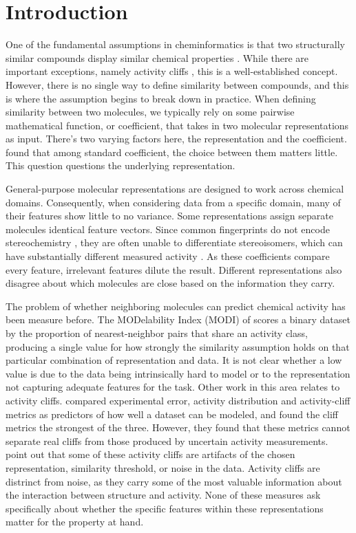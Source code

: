 \section{Introduction}

One of the fundamental assumptions in cheminformatics is that two structurally similar compounds display similar chemical properties \citep{Johnson1990}. While there are important exceptions, namely activity cliffs \citep{Stumpfe2012, vanTilborg2022}, this is a well-established concept. However, there is no single way to define similarity between compounds, and this is where the assumption begins to break down in practice. When defining similarity between two molecules, we typically rely on some pairwise mathematical function, or coefficient, that takes in two molecular representations as input. There's two varying factors here, the representation and the coefficient. \citet{Bajusz2015} found that among standard coefficient, the choice between them matters little. This question questions the underlying representation. 

General-purpose molecular representations are designed to work across chemical domains. Consequently, when considering data from a specific domain, many of their features show little to no variance. Some representations assign separate molecules identical feature vectors. Since common fingerprints do not encode stereochemistry \citep{orsi2024map4c}, they are often unable to differentiate stereoisomers, which can have substantially different measured activity \citep{Nguyen2006}. As these coefficients compare every feature, irrelevant features dilute the result. Different representations also disagree about which molecules are close based on the information they carry. 


The problem of whether neighboring molecules can predict chemical activity has been measure before. The MODelability Index (MODI) of \citet{Golbraikh2014} scores a binary dataset by the proportion of nearest-neighbor pairs that share an activity class, producing a single value for how strongly the similarity assumption holds on that particular combination of representation and data. It is not clear whether a low value is due to the data being intrinsically hard to model or to the representation not capturing adequate features for the task. Other work in this area relates to activity cliffs. \citet{Sheridan2020} compared experimental error, activity distribution and activity-cliff metrics as predictors of how well a dataset can be modeled, and found the cliff metrics the strongest of the three. However, they found that these metrics cannot separate real cliffs from  those produced by uncertain activity measurements. \citet{MedinaFranco2013} point out that some of these activity cliffs are artifacts of the chosen representation, similarity threshold, or noise in the data. Activity cliffs are distrinct from noise, as they carry some of the most valuable information about the interaction between structure and activity. None of these measures ask specifically about whether the specific features within these representations matter for the property at hand. 


